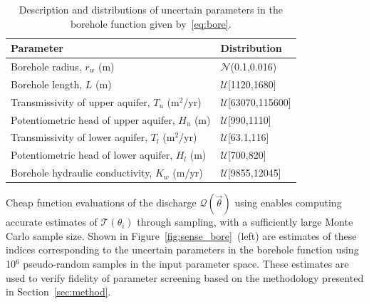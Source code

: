 \begin{table}[htbp]
\renewcommand*{\arraystretch}{1.2}
\begin{center}
\begin{tabular}{ll}
\toprule
\textbf{Parameter} & \textbf{Distribution} \\ 
\bottomrule
Borehole radius, $r_w$ (m) & $\mathcal{N}$(0.1,0.016) \\
Borehole length, $L$ (m) & $\mathcal{U}$[1120,1680] \\
Transmissivity of upper aquifer, $T_u$ (m$^2$/yr) & $\mathcal{U}$[63070,115600] \\
Potentiometric head of upper aquifer, $H_u$ (m) & $\mathcal{U}$[990,1110] \\
Transmissivity of lower aquifer, $T_l$ (m$^2$/yr) & $\mathcal{U}$[63.1,116] \\
Potentiometric head of lower aquifer, $H_l$ (m) & $\mathcal{U}$[700,820] \\
Borehole hydraulic conductivity, $K_w$ (m/yr) & $\mathcal{U}$[9855,12045] \\
\bottomrule
\end{tabular}
\end{center}

\caption{Description and distributions of uncertain parameters in the borehole function
given by~\eqref{eq:bore}.}
\label{tab:bore}
\end{table}
%
Cheap function evaluations of the discharge $\mathcal{Q}(\vec{\theta})$ using
enables computing accurate estimates of $\mathcal{T}(\theta_i)$ through
sampling, with a sufficiently large Monte Carlo sample size.  Shown in
Figure~\ref{fig:sense_bore}~(left) are estimates of these indices corresponding to the
uncertain parameters in the borehole function using 10$^6$ pseudo-random
samples in the input parameter space. 
These estimates are used to verify fidelity of
parameter screening based on the methodology presented in Section~\ref{sec:method}. 

